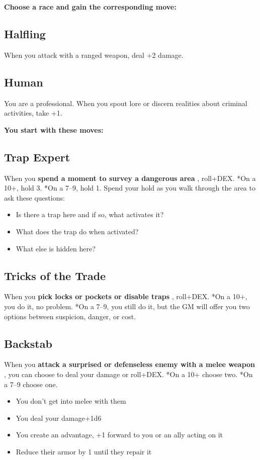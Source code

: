 {\bfseries Choose a race and gain the corresponding move:}
\subsection{Halfling}

When you attack with a ranged weapon, deal +2 damage.
\subsection{Human}

You are a professional. When you spout lore or discern realities about criminal activities, take +1.

\vspace{\baselineskip}
{\bfseries You start with these moves:}
\subsection{Trap Expert}

When you \textbf{spend a moment to survey a dangerous area}
, roll+DEX. *On a 10+, hold 3. *On a 7--9, hold 1. Spend your hold as you walk through the area to ask these questions:
\begin{itemize}
\item Is there a trap here and if so, what activates it?
\item What does the trap do when activated?
\item What else is hidden here?

\end{itemize}
\subsection{Tricks of the Trade}

When you \textbf{pick locks or pockets or disable traps}
, roll+DEX. *On a 10+, you do it, no problem. *On a 7--9, you still do it, but the GM will offer you two options between suspicion, danger, or cost.
\subsection{Backstab}

When you \textbf{attack a surprised or defenseless enemy with a melee weapon}
, you can choose to deal your damage or roll+DEX. *On a 10+ choose two. *On a 7--9 choose one.
\begin{itemize}
\item You don't get into melee with them
\item You deal your damage+1d6
\item You create an advantage, +1 forward to you or an ally acting on it
\item Reduce their armor by 1 until they repair it

\end{itemize}
